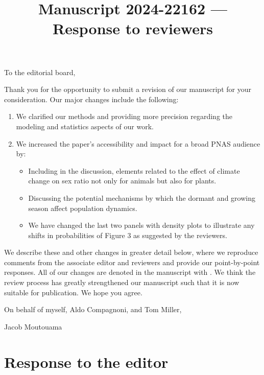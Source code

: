 \documentclass[12pt]{article}
\newcommand{\revise}[1]{{\color{Mahogany}{#1}}}
\begin{document}
\title{Manuscript 2024-22162 --- Response to reviewers}

\maketitle
\noindent To the editorial board,

Thank you for the opportunity to submit a revision of our manuscript for your consideration. Our major changes include the following:
\begin{enumerate}
	\item We clarified our methods and providing more precision regarding the modeling and statistics aspects of our work.
	\item We increased the paper’s accessibility and impact for a broad PNAS audience by: 
	\begin{itemize}
	\item Including in the discussion, elements related to the effect of climate change on sex ratio not only for animals but also for plants.
	\item Discussing the potential mechanisms by which the dormant and growing season affect population dynamics.
	\item We have changed the last two panels with density plots to illustrate any shifts in probabilities of  Figure 3 as suggested by the reviewers.
	\end{itemize}
\end{enumerate}

We describe these and other changes in greater detail below, where we reproduce comments from the associate editor and reviewers and provide our point-by-point responses. 
All of our changes are denoted in the manuscript with \revise{Mahogany font}.
We think the review process has greatly strengthened our manuscript such that it is now suitable for publication.
We hope you agree. 

\vspace{2em}
\hfill On behalf of myself, Aldo Compagnoni, and Tom Miller,

\hfill  Jacob Moutouama
\newpage

\section{Response to  the editor}
\vspace{-2em}
\end{document}
